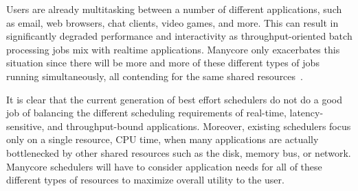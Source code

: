 \documentclass[letterpaper,twocolumn,11pt]{article}
\begin{document}
Users are already multitasking between a number of different applications, such as email, web browsers, chat clients, video games, and more. This can result in significantly degraded performance and interactivity as throughput-oriented batch processing jobs mix with realtime applications\cite{DBLP:conf/osdi/YangLBKM08}. Manycore only exacerbates this situation since there will be more and more of these different types of jobs running simultaneously, all contending for the same shared resources~\cite{liu09tessellation}. 

It is clear that the current generation of best effort schedulers do not do a good job of balancing the different scheduling requirements of real-time, latency-sensitive, and throughput-bound applications. Moreover, existing schedulers focus only on a single resource, CPU time, when many applications are actually bottlenecked by other shared resources such as the disk, memory bus, or network. Manycore schedulers will have to consider application needs for all of these different types of resources to maximize overall utility to the user.


\end{document}
